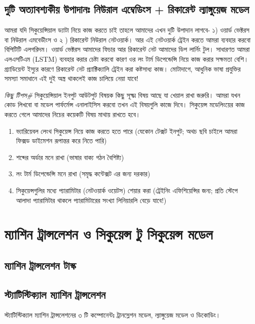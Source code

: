 \documentclass{article}[book]
\begin{document}
\subsection{দুটি অত্যাবশ্যকীয় উপাদানঃ নিউরাল এম্বেডিংস + রিকারেন্ট ল্যাঙ্গুয়েজ মডেল}
আমরা যদি সিকুয়েন্সিয়াল ড্যাটা নিয়ে কাজ করতে চাই তাহলে আমাদের এখন দুটি উপাদান লাগবে- ১) ওয়ার্ড ভেক্টরস বা নিউরাল এমবেডীংস ও ২ ) রিকারেন্ট নিউরাল নেটওয়ার্ক। 
আর এই নেটওয়ার্ক ট্রেইন করতে আমরা ব্যবহার করবো বিপিটিটি এলগরিদম। ওয়ার্ড ভেক্টরস আমাদের ফিচার আর রিকারেন্ট নেট আমাদের ডিপ লার্নিং টুল। 
সাধারণত আমরা এলএসটিএম (LSTM) ব্যবহার করার চেষ্টা করবো কারণ ওর লং টার্ম ডিপেন্ডেন্সি নিয়ে কাজ করার সক্ষমতা বেশি। গ্র্যাডিয়েন্ট ইস্যুর কারণে রিকারেন্ট নেট প্র্যাক্টিক্যালি ট্রেইন করা 
কষ্টসাধ্য কাজ। মোটাদাগে, আধুনিক ভাষা প্রযুক্তির সমস্যা সমাধানে এই দুই অস্ত্র থাকলেই কাজ চালিয়ে নেয়া যাবে! 

\textit{কিছু টিপস\#}  সিকুয়েন্সিয়াল ইনপুট আউটপুট বিষয়ক কিছু সূক্ষ্ম বিষয় আছে যা খেয়াল রাখা জরুরি। আমরা যখন কোড লিখবো বা মডেল পার্ফর্মেন্স এনালাইসিস করবো তখন এই বিষয়গুলি কাজে দিবে।
সিকুয়েন্স মডেলিংয়ের কাজ করতে গেলে আমাদের নিচের কয়েকটি বিষয় মাথায় রাখতে হবে। 

\begin{enumerate}[label=(\roman*)]
\item ভ্যারিয়েবল লেংথ সিকুয়েন্স নিয়ে কাজ করতে হতে পারে (যেকোন টেক্সট ইনপুট;  অথচ ছবি চাইলে আমরা ফিক্সড ডাইমেশন রূপান্তর করে নিতে পারি) 
\item শব্দের অর্ডার মনে রাখা (ভাষার বাক্য গঠন বৈশিষ্ট্য) 
\item লং টার্ম ডিপেন্ডেন্সি মনে রাখা (সমৃদ্ধ কন্টেক্সট এর জন্য দরকার) 
\item সিকুয়েন্সগুলির মধ্যে প্যারামিটার (নেটওয়ার্ক ওয়েটস) শেয়ার করা (ট্রেইনিং এফিশিয়েন্সির জন্য; প্রতি স্টেপে আলাদা প্যারামিটার থাকলে প্যারামিটারের সংখ্যা লিনিয়ারলি বেড়ে যাবে!) 

\end{enumerate}

\section{ম্যাশিন ট্রান্সলেশন ও  সিকুয়েন্স টু সিকুয়েন্স মডেল}
\subsection{ম্যাশিন ট্রান্সলেশন টাস্ক}
\subsection{স্ট্যাটিস্টিক্যাল ম্যাশিন ট্রান্সলেশন} 
স্ট্যাটিস্টিক্যাল ম্যাশিন ট্রান্সলেশনের ৩ টি কম্পোনেন্টঃ ট্রানস্লেশন মডেল, ল্যাঙ্গুয়েজ মডেল ও  ডিকোডিং। 
\end{document}
